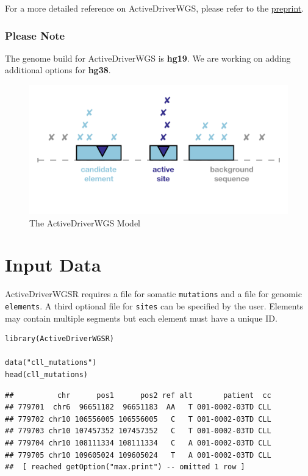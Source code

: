 \documentclass[]{article}
\begin{document}
\newline
For a more detailed reference on ActiveDriverWGS, please refer to the
\href{https://www.biorxiv.org/content/early/2017/12/19/236802}{preprint}.

\subsubsection{Please Note}\label{please-note}

The genome build for ActiveDriverWGS is \textbf{hg19}. We are working on
adding additional options for \textbf{hg38}.

\begin{figure}
\includegraphics[width=0.75\linewidth]{ADWGS_diagram} \caption{The ActiveDriverWGS Model}\label{fig:pressure}
\end{figure}

\section{Input Data}\label{input-data}

ActiveDriverWGSR requires a file for somatic \texttt{mutations} and a
file for genomic \texttt{elements}. A third optional file for
\texttt{sites} can be specified by the user. Elements may contain
multiple segments but each element must have a unique ID.

\begin{verbatim}
library(ActiveDriverWGSR)

data("cll_mutations")
head(cll_mutations)
\end{verbatim}

\begin{verbatim}
##          chr      pos1      pos2 ref alt       patient  cc
## 779701  chr6  96651182  96651183  AA   T 001-0002-03TD CLL
## 779702 chr10 106556005 106556005   C   T 001-0002-03TD CLL
## 779703 chr10 107457352 107457352   C   T 001-0002-03TD CLL
## 779704 chr10 108111334 108111334   C   A 001-0002-03TD CLL
## 779705 chr10 109605024 109605024   T   A 001-0002-03TD CLL
##  [ reached getOption("max.print") -- omitted 1 row ]
\end{verbatim}
\end{document}

